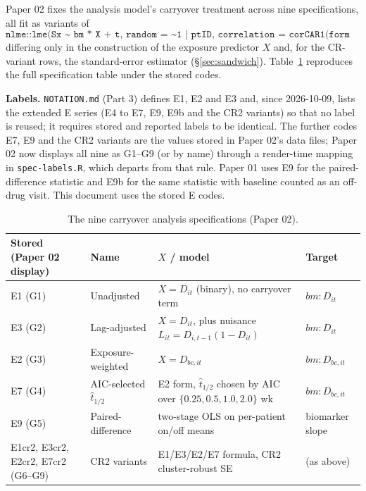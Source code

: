 \documentclass[11pt]{article}
\newcommand{\code}[1]{\texttt{#1}}
\begin{document}
Paper 02 fixes the analysis model's carryover treatment across nine
specifications, all fit as variants of
\begin{equation}
\code{nlme::lme(Sx \textasciitilde\ bm * X + t, random = \textasciitilde 1 | ptID,
  correlation = corCAR1(form = \textasciitilde t | ptID))}
\label{eq:e-base-model}
\end{equation}
differing only in the construction of the exposure predictor $X$ and,
for the CR-variant rows, the standard-error estimator
(\S\ref{sec:sandwich}). Table~\ref{tab:especs} reproduces the full
specification table under the stored codes.

\textbf{Labels.} \code{NOTATION.md} (Part 3) defines E1, E2 and E3
and, since 2026-10-09, lists the extended E series (E4 to E7, E9, E9b
and the CR2 variants) so that no label is reused; it requires stored
and reported labels to be identical. The further codes E7, E9 and the
CR2 variants are the values stored in Paper 02's data files; Paper 02 now displays all nine as G1--G9 (or
by name) through a render-time mapping in \code{spec-labels.R}, which
departs from that rule. Paper 01 uses E9 for the paired-difference
statistic and E9b for the same statistic with baseline counted as an
off-drug visit. This document uses the stored E codes.

\begin{table}[h]
\centering\small
\caption{The nine carryover analysis specifications (Paper 02).}
\label{tab:especs}
\begin{tabular}{@{}p{2.6cm}p{2.4cm}p{6.4cm}p{2.0cm}@{}}
\toprule
Stored (Paper 02 display) & Name & $X$ / model & Target \\
\midrule
E1 (G1) & Unadjusted & $X = D_{it}$ (binary), no carryover term & $bm{:}D_{it}$ \\
E3 (G2) & Lag-adjusted & $X = D_{it}$, plus nuisance $L_{it} = D_{i,t-1}(1-D_{it})$ & $bm{:}D_{it}$ \\
E2 (G3) & Exposure-weighted & $X = D_{bc,it}$ & $bm{:}D_{bc,it}$ \\
E7 (G4) & AIC-selected $\hat t_{1/2}$ & E2 form, $\hat t_{1/2}$ chosen by AIC over $\{0.25,0.5,1.0,2.0\}$ wk & $bm{:}D_{bc,it}$ \\
E9 (G5) & Paired-difference & two-stage OLS on per-patient on/off means & biomarker slope \\
E1cr2, E3cr2, E2cr2, E7cr2 (G6--G9) & CR2 variants & E1/E3/E2/E7 formula, CR2 cluster-robust SE & (as above) \\
\bottomrule
\end{tabular}
\end{table}
\end{document}

